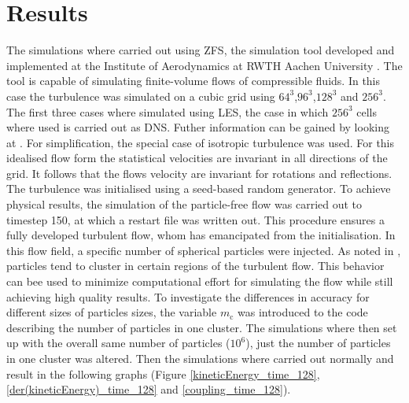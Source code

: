 \documentclass[a4paper,12pt]{article}
\numberwithin{equation}{section} %
\begin{document}
\section{Results}
The simulations where carried out using ZFS, the simulation tool developed and implemented at the Institute of Aerodynamics at RWTH Aachen University 
\cite{anAdaptiveMultilevelMultigridFormulationForCartesianHierarchicalGridMethods} \cite{aStrictlyConservativeCartesianCutCellMethodForCompressibleViscousFlowsOnAdaptiveGrids}. 
The tool is capable of simulating finite-volume flows of compressible fluids. 
In this case the turbulence was simulated on a cubic grid using $64^3$,$96^3$,$128^3$ and $256^3$. The first three cases where simulated using LES, 
the case in which $256^3$ cells where used is carried out as DNS. Futher information can be gained by looking at \cite[p.344-357 for DNS and p. 558-639 for LES]{turbulentFlows}.
\newline
For simplification, the special case of isotropic turbulence was used. For this idealised flow form the statistical 
velocities are invariant in all directions of the grid. It follows that the flows velocity are invariant for rotations and reflections. 
The turbulence was initialised using a seed-based random generator. To achieve physical results, the simulation of the particle-free flow was carried out  to timestep 150, 
at which a restart file was written out. This procedure ensures a fully developed turbulent 
flow, whom has emancipated from the initialisation. In this flow field, a specific number of spherical particles were injected. 
\newline
{}
As noted in \cite{PreferentialConcentrationOfHeavyParticles}, particles tend to cluster in certain regions of the turbulent flow. This behavior can bee used to minimize computational effort for simulating the flow while still achieving high quality results. To investigate the differences in accuracy for different sizes of particles sizes, the variable $m_\mathrm{c}$ was introduced to the code describing the number of particles in one cluster. The simulations where then set up with the overall same number of particles ($ 10^6 $), just the number of particles in one cluster was altered. Then the simulations where carried out normally and result in the following graphs (Figure \ref{kineticEnergy_time_128}, \ref{der(kineticEnergy)_time_128} and \ref{coupling_time_128}). 
\end{document}
